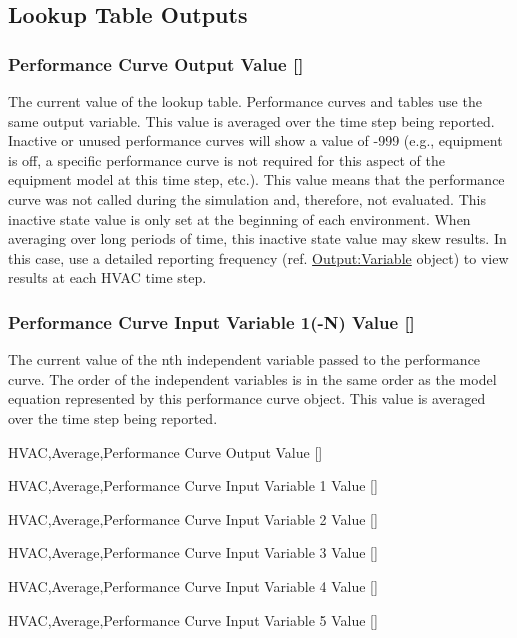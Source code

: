 \subsection{Lookup Table Outputs}\label{lookup-table-outputs}

\subsubsection{Performance Curve Output Value {[]}}\label{performance-curve-output-value-2}

The current value of the lookup table. Performance curves and tables use the same output variable. This value is averaged over the time step being reported. Inactive or unused performance curves will show a value of -999 (e.g., equipment is off, a specific performance curve is not required for this aspect of the equipment model at this time step, etc.). This value means that the performance curve was not called during the simulation and, therefore, not evaluated. This inactive state value is only set at the beginning of each environment. When averaging over long periods of time, this inactive state value may skew results. In this case, use a detailed reporting frequency (ref. \hyperref[outputvariable]{Output:Variable} object) to view results at each HVAC time step.

\subsubsection{Performance Curve Input Variable 1(-N) Value {[]}}\label{performance-curve-input-variable-1-n-value-000}

The current value of the nth independent variable passed to the performance curve. The order of the independent variables is in the same order as the model equation represented by this performance curve object. This value is averaged over the time step being reported.

HVAC,Average,Performance Curve Output Value {[]}

HVAC,Average,Performance Curve Input Variable 1 Value {[]}

HVAC,Average,Performance Curve Input Variable 2 Value {[]}

HVAC,Average,Performance Curve Input Variable 3 Value {[]}

HVAC,Average,Performance Curve Input Variable 4 Value {[]}

HVAC,Average,Performance Curve Input Variable 5 Value {[]}